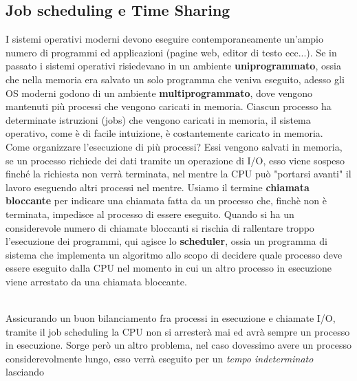 \documentclass[12pt, letterpaper]{article}
\begin{document}
\subsection{Job scheduling e Time Sharing}\label{scheduling}
I sistemi operativi moderni devono eseguire contemporaneamente un'ampio numero di programmi ed applicazioni 
(pagine web, editor di testo ecc...). Se in passato i sistemi operativi risiedevano in un ambiente \textbf{uniprogrammato},
ossia che nella memoria era salvato un solo programma che veniva eseguito, adesso gli OS moderni godono di un 
ambiente \textbf{multiprogrammato}, dove vengono mantenuti più processi che vengono caricati in memoria.
Ciascun processo ha determinate istruzioni (jobs) che vengono caricati in memoria, il sistema operativo, come è 
di facile intuizione, è costantemente caricato in memoria.\\
Come organizzare l'esecuzione di più processi? Essi vengono salvati in memoria, se un processo richiede 
dei dati tramite un operazione di I/O, esso viene sospeso finché la richiesta non verrà terminata, nel 
mentre la CPU può "portarsi avanti" il lavoro eseguendo altri processi nel mentre. Usiamo il termine 
\textbf{chiamata bloccante} per indicare una chiamata fatta da un processo che, finchè non è terminata,
impedisce al processo di essere eseguito. Quando si ha un considerevole numero di chiamate bloccanti si rischia
di rallentare troppo l'esecuzione dei programmi, qui agisce lo \textbf{scheduler}, ossia un programma di 
sistema che implementa un algoritmo allo scopo di decidere quale processo deve essere eseguito dalla CPU nel 
momento in cui un altro processo in esecuzione viene arrestato da una chiamata bloccante.
\begin{figure}[h]
\end{figure}
\\Assicurando un buon bilanciamento fra processi in esecuzione e chiamate I/O, tramite il job scheduling
la CPU non si arresterà mai ed avrà sempre un processo in esecuzione. Sorge però un altro problema, nel caso 
dovessimo avere un processo considerevolmente lungo, esso verrà eseguito per un \textit{tempo indeterminato} lasciando 
\end{document}
